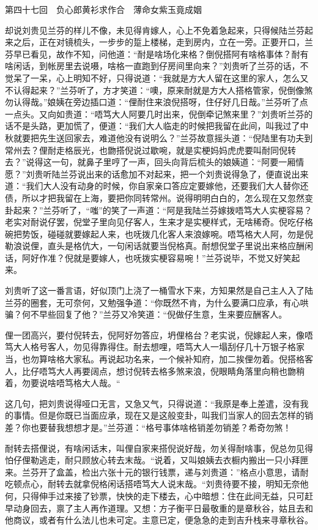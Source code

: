 \documentclass[12pt,UTF8]{ctexbook}
\begin{document}
{{{第四十七回　负心郎黄衫求作合　薄命女紫玉竟成姻





却说刘贵见兰芬的样儿不像，未见得肯嫁人，心上不免着急起来，只得候陆兰芬起来之后，正在对镜梳头，一步步的踅上楼梯，走到房内，立在一旁。正要开口，兰芬早已看见，故作不知，问他道：“耐是啥场化来格？倒倪搭阿有啥格事体？耐有啥闲话，到帐房里去说嗫，啥格一直跑到仔房间里向来？”刘贵听了兰芬的话，不觉呆了一呆，心上明知不好，只得说道：“我就是方大人留在这里的家人，怎么又不认得起来？”兰芬听了，方才笑道：“噢，原来耐就是方大人搭格管家，倪倒像煞勿认得哉。”娘姨在旁边插口道：“俚耐住来浪倪搭呀，住仔好几日哉。”兰芬听了点一点头。又向如贵道：“唔笃大人阿要几时出来，倪倒牵记煞来里？”刘贵听兰芬的话不是头路，更加慌了，便道：“我们大人临走的时候把我留在此间，叫我过了中秋就要把先生送回家去，难道他没有说明么？”兰芬故意摇头道：“倪陆里有功夫到常州去？俚耐走格辰光，也朆搭倪说过歇啘，就是实梗妈妈虎虎要叫耐同倪转去？”说得这一句，就鼻子里哼了一声，回头向背后梳头的娘姨道：“阿要一厢情愿？”刘贵听陆兰芬说出来的话愈加不对起来，把一个刘贵说得急了，便直说出来道：“我们大人没有动身的时候，你自家亲口答应定要嫁他，还要我们大人替你还债，所以才把我留在上海，要把你同转常州。说得明明白白的，怎么现在又忽然变卦起来？”兰芬听了，“嗤”的笑了一声道：“阿是我陆兰芬嫁拨唔笃大人实梗容易？老实对耐说仔罢，倪堂子里向见仔客人，生来才是实梗样式，无啥稀奇。倪吃仔格碗把势饭，碰碰就要嫁起人来，也呒拨几化客人来浪嫁啘。唔笃格大人阿，勿是倪勒浪说俚，直头是格伉大，一句闲话就要当倪格真。耐想倪堂子里说出来格应酬闲话，阿好作准？倪就是要嫁人，也呒拨实梗容易啘！”兰芬说毕，不觉又好笑起来。

刘贵听了这一番言语，好似顶门上浇了一桶雪水下来，方知果然是自己主人入了陆兰芬的圈套，无可奈何，又勉强争道：“你既然不肯，为什么要满口应承，有心哄骗？何不早些回复了他？”兰芬又冷笑道：“倪做仔生意，生来要应酬客人。

俚一团高兴，要付倪转去，倪阿好勿答应，坍俚格台？老实说，倪嫁起人来，像唔笃大人格号客人，勿见得靠得住。耐去想哩，唔笃大人一塌刮仔几十万银子格家当，也勿算啥格大家私。再说起功名来，一个候补知府，加二挨俚勿着。倪搭格客人，比仔唔笃大人再要阔点，想讨倪转去格多煞来浪，倪眼睛角落里向稍也朆稍着，勿要说啥唔笃格大人哉。“

这几句，把刘贵说得哑口无言，又急又气，只得说道：“我原是奉上差遣，没有我的事情。但是你既已当面应承，现在又是这般变卦，叫我们当家人的回去怎样的销差？你也要替我想想才是。”兰芬道：“格号事体啥格销差勿销差？希奇勿煞！

耐转去搭俚说，有啥闲话末，叫俚自家来搭倪说好哉，勿关得耐啥事，倪总勿见得怕仔俚勒逃走，耐只顾放心转去末哉。“说着，又叫娘姨去衣橱内搬出一只小拜匣来。兰芬开了盒盖，检出六张十元的银行钱票，递与刘贵道：”格点小意思，请耐吃顿点心，耐转去就拿倪格闲话搭唔笃大人说末哉。“刘贵待要不接，明知无奈他何，只得伸手过来接了钞票，快怏的走下楼去，心中暗想：住在此间无益，只可赶早动身回去，禀了主人再作道理。又想：方子衡平日最敬重的是章秋谷，姑且去和他商议，或者有什么法儿也未可定。主意已定，便急急的走到吉升栈来寻章秋谷。

}}}
\end{document}
